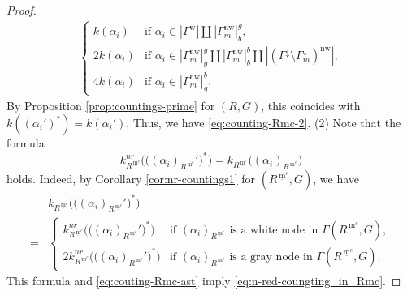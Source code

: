 \documentclass[11pt]{amsart}
\newcommand{\mc}{\, \underline{\mathrm{m}}^c}
\newcommand{\w}{\mathrm{w}}
\newcommand{\nw}{\mathrm{nw}}
\begin{document}
{\begin{proof}
\begin{align*}
\begin{cases}
k(\alpha_i) & \text{if } \alpha_i\in |\Gamma^\w|\amalg |\Gamma_m^\nw|_b^g ,\\
2k(\alpha_i) & \text{if } \alpha_i\in |\Gamma_m^\nw|_g^g\amalg |\Gamma_m^\nw|_b^b
\amalg |(\Gamma^{\downarrow}\setminus\Gamma^{\downarrow}_m)^\nw|,\\
4k(\alpha_i) & \text{if }\alpha_i\in|\Gamma_m^\nw|_g^b.
\end{cases}
\end{align*}
By Proposition \ref{prop:countings-prime} for $(R,G)$, this coincides with 
$k((\alpha_i')^\ast)=k(\alpha_i')$. Thus, we have \eqref{eq:counting-Rmc-2}.
\vskip 1mm
\noindent
(2) Note that the formula
\begin{equation}\label{eq:n-red-coungting_in_Rmc}
k_{R^{\mc}}^{nr}\big(\big((\alpha_i)_{R^{\mc}}'\big)^\ast\big)=
k_{R^{\mc}}\big((\alpha_i)_{R^{\mc}}\big)
\end{equation}
holds. Indeed, by Corollary \ref{cor:nr-countings1} for $(R^{\mc},G)$, we have
\begin{align*}
&k_{R^{\mc}}\big(\big((\alpha_i)_{R^{\mc}}'\big)^\ast\big) \\
=
&\begin{cases}
k_{R^{\mc}}^{nr}\big(\big((\alpha_i)_{R^{\mc}}'\big)^\ast\big) & 
\text{if $(\alpha_i)_{R^{\mc}}$ is a white node in $\Gamma(R^{\mc},G)$},\\
2k_{R^{\mc}}^{nr}\big(\big((\alpha_i)_{R^{\mc}}'\big)^\ast\big) &
\text{if $(\alpha_i)_{R^{\mc}}$ is a gray node in $\Gamma(R^{\mc},G)$}.
\end{cases}
\end{align*}
This formula and \eqref{eq:couting-Rmc-ast} imply
\eqref{eq:n-red-coungting_in_Rmc}.


\end{proof}}
\end{document}
